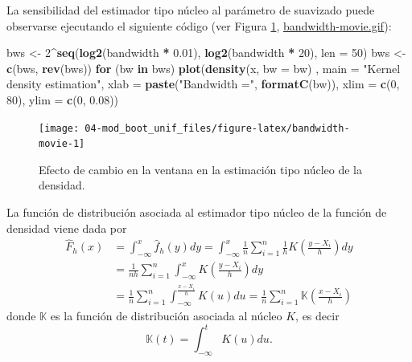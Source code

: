 \documentclass[]{book}
\newenvironment{Shaded}{\begin{snugshade}}{\end{snugshade}}
\newcommand{\KeywordTok}[1]{\textcolor[rgb]{0.13,0.29,0.53}{\textbf{#1}}}
\newcommand{\DataTypeTok}[1]{\textcolor[rgb]{0.13,0.29,0.53}{#1}}
\newcommand{\DecValTok}[1]{\textcolor[rgb]{0.00,0.00,0.81}{#1}}
\newcommand{\FloatTok}[1]{\textcolor[rgb]{0.00,0.00,0.81}{#1}}
\newcommand{\StringTok}[1]{\textcolor[rgb]{0.31,0.60,0.02}{#1}}
\newcommand{\ControlFlowTok}[1]{\textcolor[rgb]{0.13,0.29,0.53}{\textbf{#1}}}
\newcommand{\OperatorTok}[1]{\textcolor[rgb]{0.81,0.36,0.00}{\textbf{#1}}}
\newcommand{\NormalTok}[1]{#1}
\theoremstyle{definition}
\theoremstyle{definition}
\theoremstyle{definition}
\theoremstyle{remark}
\begin{document}
La sensibilidad del estimador tipo núcleo al parámetro de suavizado
puede observarse ejecutando el siguiente código (ver Figura
\ref{fig:bandwidth-movie},
\href{./bandwidth-movie.gif}{bandwidth-movie.gif}):

\begin{Shaded}
\begin{Highlighting}[]
\NormalTok{bws <-}\StringTok{ }\DecValTok{2}\OperatorTok{^}\KeywordTok{seq}\NormalTok{(}\KeywordTok{log2}\NormalTok{(bandwidth }\OperatorTok{*}\StringTok{ }\FloatTok{0.01}\NormalTok{), }\KeywordTok{log2}\NormalTok{(bandwidth }\OperatorTok{*}\StringTok{ }\DecValTok{20}\NormalTok{), }\DataTypeTok{len =} \DecValTok{50}\NormalTok{)}
\NormalTok{bws <-}\StringTok{ }\KeywordTok{c}\NormalTok{(bws, }\KeywordTok{rev}\NormalTok{(bws))}
\ControlFlowTok{for}\NormalTok{ (bw }\ControlFlowTok{in}\NormalTok{ bws)}
  \KeywordTok{plot}\NormalTok{(}\KeywordTok{density}\NormalTok{(x, }\DataTypeTok{bw =}\NormalTok{ bw) , }\DataTypeTok{main =} \StringTok{"Kernel density estimation"}\NormalTok{, }
         \DataTypeTok{xlab =} \KeywordTok{paste}\NormalTok{(}\StringTok{"Bandwidth ="}\NormalTok{, }\KeywordTok{formatC}\NormalTok{(bw)), }
         \DataTypeTok{xlim =} \KeywordTok{c}\NormalTok{(}\DecValTok{0}\NormalTok{, }\DecValTok{80}\NormalTok{), }\DataTypeTok{ylim =} \KeywordTok{c}\NormalTok{(}\DecValTok{0}\NormalTok{, }\FloatTok{0.08}\NormalTok{))}
\end{Highlighting}
\end{Shaded}

\begin{figure}[!htb]

{\centering \texttt{[image: 04-mod\_boot\_unif\_files/figure-latex/bandwidth-movie-1]} 

}

\caption{Efecto de cambio en la ventana en la estimación tipo núcleo de la densidad.}\label{fig:bandwidth-movie}
\end{figure}

La función de distribución asociada al estimador tipo núcleo de la
función de densidad viene dada por \[\begin{aligned}
\hat{F}_{h}\left( x \right) &= \int_{-\infty }^{x}\hat{f}_{h}\left( y \right) dy
=\int_{-\infty }^{x}\frac{1}{n}\sum_{i=1}^{n}\frac{1}{h}
K\left( \frac{y-X_i}{h} \right) dy \\
&= \frac{1}{nh}\sum_{i=1}^{n}\int_{-\infty }^{x}
K\left( \frac{y-X_i}{h} \right) dy \\
&= \frac{1}{n}\sum_{i=1}^{n}\int_{-\infty }^{\frac{x-X_i}{h}}K\left( u \right) du
=\frac{1}{n}\sum_{i=1}^{n}\mathbb{K}\left( \frac{x-X_i}{h} \right)
\end{aligned}\] donde \(\mathbb{K}\) es la función de distribución
asociada al núcleo \(K\), es decir
\[\mathbb{K}\left( t \right) =\int_{-\infty }^{t}K\left(
u \right) du.\]
\end{document}
